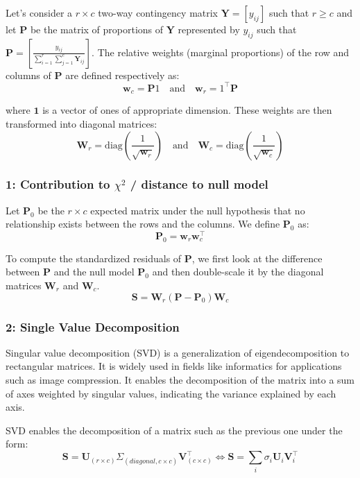 Let's consider a $r \times c$ two-way contingency matrix $\mathbf{Y} = [y_{ij}]$ such that $r\geq c$ and let $\mathbf{P}$ be the matrix of proportions of $\mathbf{Y}$ represented by $y_{ij}$ such that $\mathbf{P} = \left[ \frac{y_{ij}}{\sum_{i=1}^{r} \sum_{j=1}^{c} \mathbf{Y}_{ij}} \right]$.
The relative weights (marginal proportions) of the row and columns of $\mathbf{P}$ are defined respectively as: 
$$
    \mathbf{w}_c = \mathbf{P}1 \quad \text{and} \quad \mathbf{w}_r = 1^\intercal\mathbf{P}
$$

where \(\mathbf{1}\) is a vector of ones of appropriate dimension.
These weights are then transformed into diagonal matrices: 
$$
    \mathbf{W}_r = \text{diag}\left(\frac{1}{\sqrt{\mathbf{w}_r}}\right) \quad \text{and} \quad \mathbf{W}_c = \text{diag}\left(\frac{1}{\sqrt{\mathbf{w}_c}}\right)
$$

\subsubsection{1: Contribution to $\chi^2$ / distance to null model}

Let $\mathbf{P}_0$ be the $r\times c$ expected matrix under the null hypothesis that no relationship exists between the rows and the columns. We define $\mathbf{P}_0$ as:
$$
    \mathbf{P}_0 = \mathbf{w}_r \mathbf{w}_c^\intercal
$$

To compute the standardized residuals of $\mathbf{P}$, we first look at the difference between $\mathbf{P}$ and the null model $\mathbf{P}_0$ and then double-scale it by the diagonal matrices $\mathbf{W}_r$ and $\mathbf{W}_c$. 
$$
    \mathbf{S} = \mathbf{W}_r (\mathbf{P} - \mathbf{P}_0) \mathbf{W}_c
$$

\subsubsection{2: Single Value Decomposition}

Singular value decomposition (SVD) is a generalization of eigendecomposition to rectangular matrices. It is widely used in fields like informatics for applications such as image compression. It enables the decomposition of the matrix into a sum of axes weighted by singular values, indicating the variance explained by each axis.


SVD enables the decomposition of a matrix such as the previous one under the form: 
$$
    \mathbf{S} = \mathbf{U}_{(r\times c)} \Sigma_{(diagonal, c\times c)} \mathbf{V}_{(c \times c)}^\intercal \Leftrightarrow \mathbf{S} = \sum_i \sigma_i \mathbf{U}_i \mathbf{V}_i^\intercal
$$

